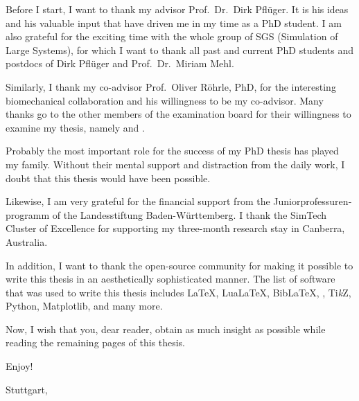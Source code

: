 
Before I start, I want to thank my advisor Prof.\ Dr.\ Dirk Pflüger.
It is his ideas and his valuable input that have driven me in
my time as a PhD student.
I am also grateful for the exciting time with the whole group of SGS
(Simulation of Large Systems),
for which I want to thank all past and current PhD students and postdocs of
Dirk Pflüger and Prof.\ Dr.\ Miriam Mehl.

Similarly, I thank my co-advisor Prof.\ Oliver Röhrle, PhD, for the
interesting biomechanical collaboration and his willingness to be my co-advisor.
Many thanks go to the other members of the examination board for their
willingness to examine my thesis,
namely  and .

Probably the most important role for the success of my PhD thesis
has played my family.
Without their mental support and distraction from the daily work,
I doubt that this thesis would have been possible.

Likewise, I am very grateful for the financial support from
the \foreignlanguage{ngerman}{Juniorprofessurenprogramm} of the
\foreignlanguage{ngerman}{Landesstiftung Baden-Württemberg}.
I thank the SimTech Cluster of Excellence for supporting
my three-month research stay in Canberra, Australia.

In addition, I want to thank the open-source community for making it possible to
write this thesis in an aesthetically sophisticated manner.
The list of software that was used to write this thesis includes
\LaTeX, Lua\LaTeX, Bib\LaTeX,
\scalebox{0.9}{\KOMAScript}, Ti\emph{k}Z, Python, Matplotlib,
and many more.

\label{page:preface}
Now, I wish that you, dear reader, obtain as much insight as possible
while reading the remaining
 pages of this thesis.

Enjoy!

\vspace{1em}

\noindent
Stuttgart, \thedate

\noindent
\theauthor

